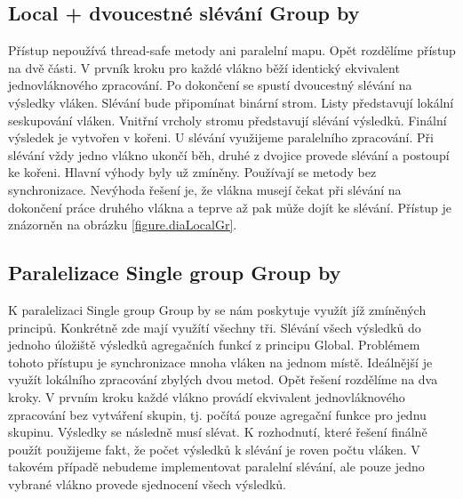 \subsection{Local + dvoucestné slévání Group by} \label{anal.groupby.local}

Přístup nepoužívá thread-safe metody ani paralelní mapu.
Opět rozdělíme přístup na dvě části.
V prvník kroku pro každé vlákno běží identický ekvivalent jednovláknového zpracování.
Po dokončení se spustí dvoucestný slévání na výsledky vláken.
Slévání bude připomínat binární strom.
Listy představují lokální seskupování vláken.
Vnitřní vrcholy stromu představují slévání výsledků.
Finální výsledek je vytvořen v kořeni.
U slévání využijeme paralelního zpracování.
Při slévání vždy jedno vlákno ukončí běh, druhé z dvojice provede slévání a postoupí ke kořeni. 
Hlavní výhody byly už zmíněny.
Používají se metody bez synchronizace.
Nevýhoda řešení je, že vlákna musejí čekat při slévání na dokončení práce druhého vlákna a teprve až pak může dojít ke slévání.
Přístup je znázorněn na obrázku \ref{figure.diaLocalGr}.

\subsection{Paralelizace Single group Group by} \label{anal.groupby.singlegroup}

K paralelizaci Single group Group by se nám poskytuje využít jíž zmíněných principů.
Konkrétně zde mají využítí všechny tři.
Slévání všech výsledků do jednoho úložiště výsledků agregačních funkcí z principu Global.
Problémem tohoto přístupu je synchronizace mnoha vláken na jednom místě.
Ideálnější je využít lokálního zpracování zbylých dvou metod.
Opět řešení rozdělíme na dva kroky. 
V prvním kroku každé vlákno provádí ekvivalent jednovláknového zpracování bez vytváření skupin, tj. počítá pouze agregační funkce pro jednu skupinu.
Výsledky se následně musí slévat.
K rozhodnutí, které řešení finálně použít použijeme fakt, že počet výsledků k slévání je roven počtu vláken.
V takovém případě nebudeme implementovat paralelní slévání, ale pouze jedno vybrané vlákno provede sjednocení všech výsledků.


